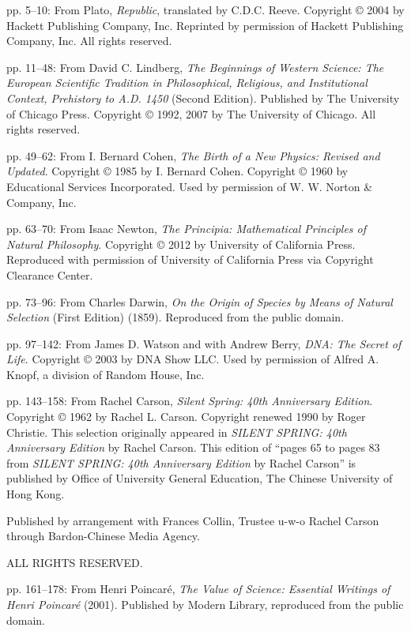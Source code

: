 \vspace{0.5em}

\noindent pp. 5--10: From Plato, \textit{Republic}, translated by C.D.C. Reeve. Copyright © 2004 by Hackett Publishing Company, Inc. Reprinted by permission of Hackett Publishing Company, Inc. All rights reserved.

\noindent pp. 11--48: From David C. Lindberg, \textit{The Beginnings of Western Science: The European Scientific Tradition in Philosophical, Religious, and Institutional Context, Prehistory to A.D. 1450} (Second Edition). Published by The University of Chicago Press. Copyright © 1992, 2007 by The University of Chicago. All rights reserved.

\noindent pp. 49--62: From I. Bernard Cohen, \textit{The Birth of a New Physics: Revised and Updated}. Copyright © 1985 by I. Bernard Cohen. Copyright © 1960 by Educational Services Incorporated. Used by permission of W. W. Norton \& Company, Inc.

\noindent pp. 63--70: From Isaac Newton, \textit{The Principia: Mathematical Principles of Natural Philosophy}. Copyright © 2012 by University of California Press. Reproduced with permission of University of California Press via Copyright Clearance Center.

\noindent pp. 73--96: From Charles Darwin, \textit{On the Origin of Species by Means of Natural Selection} (First Edition) (1859). Reproduced from the public domain.

\noindent pp. 97--142: From James D. Watson and with Andrew Berry, \textit{DNA: The Secret of Life}. Copyright © 2003 by DNA Show LLC. Used by permission of Alfred A. Knopf, a division of Random House, Inc.

\noindent pp. 143--158: From Rachel Carson, \textit{Silent Spring: 40th Anniversary Edition}. Copyright © 1962 by Rachel L. Carson. Copyright renewed 1990 by Roger Christie. This selection originally appeared in \textit{SILENT SPRING: 40th Anniversary Edition} by Rachel Carson. This edition of ``pages 65 to pages 83 from \textit{SILENT SPRING: 40th Anniversary Edition} by Rachel Carson'' is published by Office of University General Education, The Chinese University of Hong Kong.

\noindent Published by arrangement with Frances Collin, Trustee u-w-o Rachel Carson through Bardon-Chinese Media Agency.

\noindent ALL RIGHTS RESERVED.

\noindent pp. 161--178: From Henri Poincaré, \textit{The Value of Science: Essential Writings of Henri Poincaré} (2001). Published by Modern Library, reproduced from the public domain.

